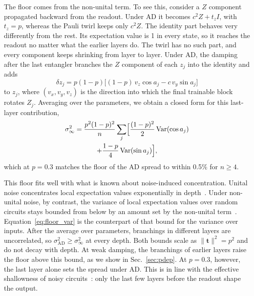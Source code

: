 \documentclass[
 aps,pra,
 twocolumn,
 superscriptaddress,
 longbibliography,
 nofootinbib
]{revtex4-2}
\newcommand{\AD}{\mathrm{AD}}
\begin{document}
The floor comes from the
non-unital term. To see this, consider a $Z$ component propagated backward
from the readout. Under AD it becomes $c^2Z+t_zI$, with $t_z=p$, whereas the
Pauli twirl keeps only $c^2Z$. The identity part behaves very differently from
the rest. Its expectation value is 1 in every state, so it reaches the readout
no matter what the earlier layers do. The twirl has no such part, and every
component keeps shrinking from layer to layer. Under AD, the damping after the last entangler
branches the $Z$ component of each $z_j$ into the identity and adds
\begin{equation}
\delta z_j=p(1-p)\bigl[(1-p)\,v_z\cos a_j-c\,v_y\sin a_j\bigr]
\label{eq:floor}
\end{equation}
to $z_j$, where $(v_x,v_y,v_z)$ is the direction into which the final
trainable block rotates $Z_j$. Averaging over the parameters,
we obtain a closed form for this last-layer
contribution,
\begin{multline}
\sigma_\infty^2=\frac{p^2(1-p)^2}{n}\sum_j\Bigl[\frac{(1-p)^2}{2}\,
\mathrm{Var}(\cos a_j)\\
+\frac{1-p}{4}\,\mathrm{Var}(\sin a_j)\Bigr],
\label{eq:floor_var}
\end{multline}
which at $p=0.3$ matches the floor of the AD spread to within 0.5\% for $n\ge4$.

This floor fits well with what is
known about noise-induced concentration. Unital noise concentrates local
expectation values exponentially in
depth~\cite{wang2021noiseinduced,schumann2024emergence}. Under non-unital
noise, by contrast, the variance of local expectation values over random
circuits stays bounded from below by an amount set by the non-unital
term~\cite{mele2026noise}. Equation~\eqref{eq:floor_var} is the counterpart of
that bound for the variance over inputs. After the average over parameters,
branchings in different layers are uncorrelated, so
$\sigma_{\AD}^2\ge\sigma_\infty^2$ at every depth. Both bounds scale as
$\lVert\mathbf t\rVert^2=p^2$ and do not decay with depth. At weak damping, the
branchings of earlier layers raise the floor above this bound, as we show in
Sec.~\ref{sec:pdep}. At $p=0.3$, however, the last
layer alone sets the spread under AD. This is in line with the
effective shallowness of noisy circuits~\cite{mele2026noise}: only the last few
layers before the readout shape the output.
\end{document}

